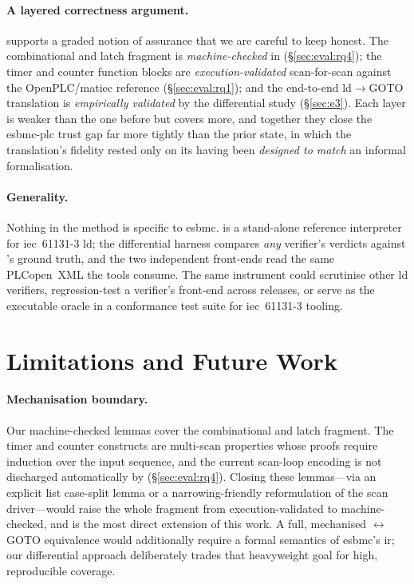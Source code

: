 \paragraph{A layered correctness argument.} \kld{} supports a graded notion of
assurance that we are careful to keep honest. The combinational and latch fragment
is \emph{machine-checked} in  (\S\ref{sec:eval:rq4}); the timer and
counter function blocks are \emph{execution-validated} scan-for-scan against the
OpenPLC/\gls{matiec} reference (\S\ref{sec:eval:rq1}); and the end-to-end
\gls{ld}$\rightarrow$GOTO translation is \emph{empirically validated} by the
differential study (\S\ref{sec:e3}). Each layer is weaker than the one before but
covers more, and together they close the \gls{esbmc}-\gls{plc} trust gap far more
tightly than the prior state, in which the translation's fidelity rested only on
its having been \emph{designed to match} an informal formalisation.

\paragraph{Generality.} Nothing in the method is specific to \gls{esbmc}. \kld{} is
a stand-alone reference interpreter for \gls{iec}~61131-3 \gls{ld}; the differential
harness compares \emph{any} verifier's verdicts against \kld{}'s ground truth, and
the two independent front-ends read the same PLCopen~XML the tools consume. The
same instrument could scrutinise other \gls{ld} verifiers, regression-test a
verifier's front-end across releases, or serve as the executable oracle in a
conformance test suite for \gls{iec}~61131-3 tooling.

\section{Limitations and Future Work}
\label{sec:limits}

\paragraph{Mechanisation boundary.} Our machine-checked lemmas cover the
combinational and latch fragment. The timer and counter constructs are multi-scan
properties whose proofs require induction over the input sequence, and the current
scan-loop encoding is not discharged automatically by  (\S\ref{sec:eval:rq4}).
Closing these lemmas---via an explicit list case-split lemma or a narrowing-friendly
reformulation of the scan driver---would raise the whole fragment from
execution-validated to machine-checked, and is the most direct extension of this
work. A full, mechanised \kld{}$\leftrightarrow$GOTO equivalence would additionally
require a formal semantics of \gls{esbmc}'s \gls{ir}; our differential approach
deliberately trades that heavyweight goal for high, reproducible coverage.

